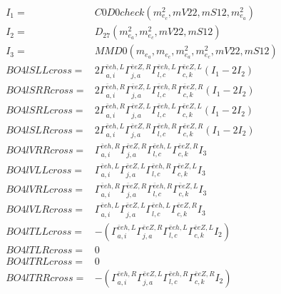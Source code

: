 \documentclass[A4,landscape]{article}
\begin{document}
\begin{align} 
I_1 = & C0D0check(m^2_{e_{{c}}}, mV22, mS12, m^2_{e_{{a}}}) \\ 
I_2 = & D_{27}(m^2_{e_{{a}}}, m^2_{e_{{c}}}, mV22, mS12) \\ 
I_3 = & MMD0(m_{e_{{a}}}, m_{e_{{c}}}, m^2_{e_{{a}}}, m^2_{e_{{c}}}, mV22, mS12) \\ 
  BO4lSLLcross= & 2  \Gamma^{\bar{e}e h ,L}_{a, i} \Gamma^{\bar{e}e Z ,R}_{j, a} \Gamma^{\bar{e}e h ,L}_{l, c} \Gamma^{\bar{e}e Z ,L}_{c, k} (I_1 - 2 I_2) \\ 
  BO4lSRRcross= & 2  \Gamma^{\bar{e}e h ,R}_{a, i} \Gamma^{\bar{e}e Z ,L}_{j, a} \Gamma^{\bar{e}e h ,R}_{l, c} \Gamma^{\bar{e}e Z ,R}_{c, k} (I_1 - 2 I_2) \\ 
  BO4lSRLcross= & 2  \Gamma^{\bar{e}e h ,R}_{a, i} \Gamma^{\bar{e}e Z ,L}_{j, a} \Gamma^{\bar{e}e h ,L}_{l, c} \Gamma^{\bar{e}e Z ,L}_{c, k} (I_1 - 2 I_2) \\ 
  BO4lSLRcross= & 2  \Gamma^{\bar{e}e h ,L}_{a, i} \Gamma^{\bar{e}e Z ,R}_{j, a} \Gamma^{\bar{e}e h ,R}_{l, c} \Gamma^{\bar{e}e Z ,R}_{c, k} (I_1 - 2 I_2) \\ 
  BO4lVRRcross= &  \Gamma^{\bar{e}e h ,R}_{a, i} \Gamma^{\bar{e}e Z ,R}_{j, a} \Gamma^{\bar{e}e h ,L}_{l, c} \Gamma^{\bar{e}e Z ,R}_{c, k} I_3 \\ 
  BO4lVLLcross= &  \Gamma^{\bar{e}e h ,L}_{a, i} \Gamma^{\bar{e}e Z ,L}_{j, a} \Gamma^{\bar{e}e h ,R}_{l, c} \Gamma^{\bar{e}e Z ,L}_{c, k} I_3 \\ 
  BO4lVRLcross= &  \Gamma^{\bar{e}e h ,R}_{a, i} \Gamma^{\bar{e}e Z ,R}_{j, a} \Gamma^{\bar{e}e h ,R}_{l, c} \Gamma^{\bar{e}e Z ,L}_{c, k} I_3 \\ 
  BO4lVLRcross= &  \Gamma^{\bar{e}e h ,L}_{a, i} \Gamma^{\bar{e}e Z ,L}_{j, a} \Gamma^{\bar{e}e h ,L}_{l, c} \Gamma^{\bar{e}e Z ,R}_{c, k} I_3 \\ 
  BO4lTLLcross= & -( \Gamma^{\bar{e}e h ,L}_{a, i} \Gamma^{\bar{e}e Z ,R}_{j, a} \Gamma^{\bar{e}e h ,L}_{l, c} \Gamma^{\bar{e}e Z ,L}_{c, k} I_2) \\ 
  BO4lTLRcross= & 0 \\ 
  BO4lTRLcross= & 0 \\ 
  BO4lTRRcross= & -( \Gamma^{\bar{e}e h ,R}_{a, i} \Gamma^{\bar{e}e Z ,L}_{j, a} \Gamma^{\bar{e}e h ,R}_{l, c} \Gamma^{\bar{e}e Z ,R}_{c, k} I_2) \\ 
\end{align} 
\end{document}
